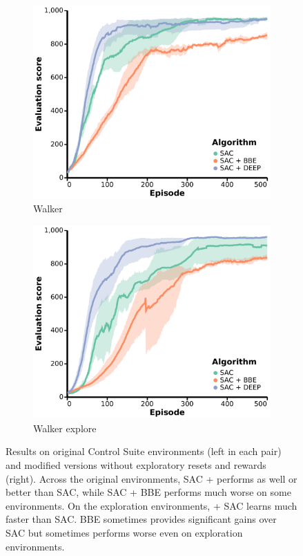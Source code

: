 \begin{figure}[ht]
\begin{subfigure}[b]{0.24\textwidth}
        \centering
        \includegraphics[width=\textwidth]{figures/deep/neurips_walker.pdf}
        \caption{Walker}
    \end{subfigure}
    \begin{subfigure}[b]{0.24\textwidth}
        \centering
        \includegraphics[width=\textwidth]{figures/deep/neurips_walker_explore.pdf}
        \caption{Walker explore}
    \end{subfigure}
    \caption{Results on original Control Suite environments (left in each pair) and modified versions without exploratory resets and rewards (right).
    Across the original environments, SAC + \algshort{} performs as well or better than SAC, while SAC + BBE performs much worse on some environments.
    On the exploration environments, \algshort{} + SAC learns much faster than SAC.
    BBE sometimes provides significant gains over SAC but sometimes performs worse even on exploration environments.
    }
    \label{fig:control_suite}
\end{figure}

